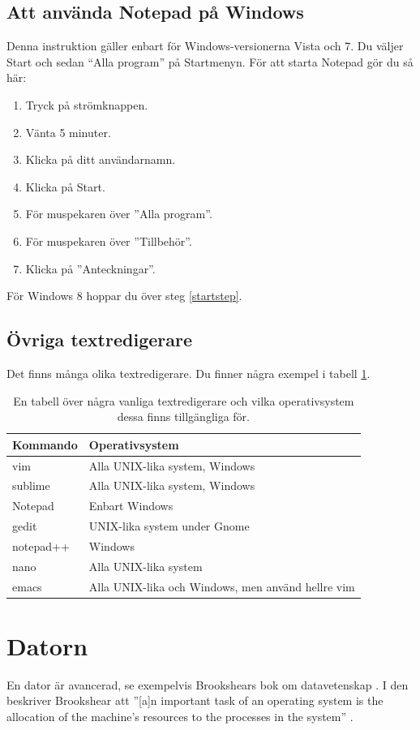 \documentclass[a4paper]{article}
\begin{document}
\subsection{Att använda Notepad på Windows}
\label{sec:Notepad}
Denna instruktion gäller enbart för Windows-versionerna Vista och 7.
Du väljer Start och sedan ``Alla program'' på Startmenyn.
För att starta Notepad gör du så här:
\begin{enumerate}
  \item Tryck på strömknappen.
  \item Vänta 5 minuter.
  \item Klicka på ditt användarnamn.
  \item\label{startstep} Klicka på Start.
  \item För muspekaren över ''Alla program''.
  \item För muspekaren över ''Tillbehör''.
  \item Klicka på ''Anteckningar''.
\end{enumerate}
För Windows 8 hoppar du över steg \ref{startstep}.

\subsection{Övriga textredigerare}
\label{sec:misc}
Det finns många olika textredigerare.
Du finner några exempel i tabell \ref{tab:editors}.

\begin{table}
  \centering
  \begin{tabular}{l|l}
    \textbf{Kommando}   & \textbf{Operativsystem} \\
    \hline
    vim                 & Alla UNIX-lika system, Windows \\
    sublime             & Alla UNIX-lika system, Windows \\
    Notepad             & Enbart Windows \\
    gedit               & UNIX-lika system under Gnome \\
    notepad++           & Windows \\
    nano                & Alla UNIX-lika system \\
    emacs               & Alla UNIX-lika och Windows, men använd hellre vim \\
  \end{tabular}
  \caption{En tabell över några vanliga textredigerare och vilka operativsystem 
  dessa finns tillgängliga för.}
  \label{tab:editors}
\end{table}


\section{Datorn}
\label{sec:computer}
En dator är avancerad, se exempelvis Brookshears bok om datavetenskap 
\cite{Brookshear2012csa}.
I den beskriver Brookshear att ''[a]n important task of an operating system is 
the allocation of the machine's resources to the processes in the system'' 
\cite[sidan 139]{Brookshear2012csa}.



\end{document}
